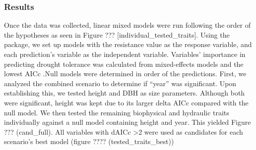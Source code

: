 \documentclass[]{article}
\begin{document}
\hypertarget{results}{%
\subsubsection{Results}\label{results}}

Once the data was collected, linear mixed models were run following the
order of the hypotheses as seen in Figure ???
{[}individual\_tested\_traits{]}. Using the \citep{R-pointRes} package,
we set up models with the resistance value as the response variable, and
each prediction's variable as the independent variable. Variables'
importance in predicting drought tolerance was calculated from
mixed-effects models and the lowest AICc
\citep[\citet{R-AICcmodavg}]{R-lme4}.Null models were determined in
order of the predictions. First, we analyzed the combined scenario to
determine if ``year'' was significant. Upon establishing this, we tested
height and DBH as size parameters. Although both were significant,
height was kept due to its larger delta AICc compared with the null
model. We then tested the remaining biophysical and hydraulic traits
individually against a null model containing height and year. This
yielded Figure ??? (cand\_full). All variables with dAICc \textgreater2
were used as candidates for each scenario's best model (figure ????
(tested\_traits\_best))
\end{document}
